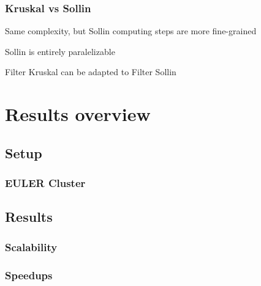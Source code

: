 \documentclass{beamer}
\begin{document}
\begin{frame}
\frametitle{Kruskal vs Sollin}
\item Same complexity, but Sollin computing steps are more fine-grained
\item Sollin is entirely paralelizable
\item Filter Kruskal can be adapted to Filter Sollin
\end{frame}


\begin{frame}
    \printbibliography
\end{frame} 

\section{Results overview}

\subsection{Setup}

\begin{frame}
\frametitle{EULER Cluster}

\end{frame}

\subsection{Results}

\begin{frame}
\frametitle{Scalability}

\end{frame}

\begin{frame}
\frametitle{Speedups}

\end{frame}
\end{document}
